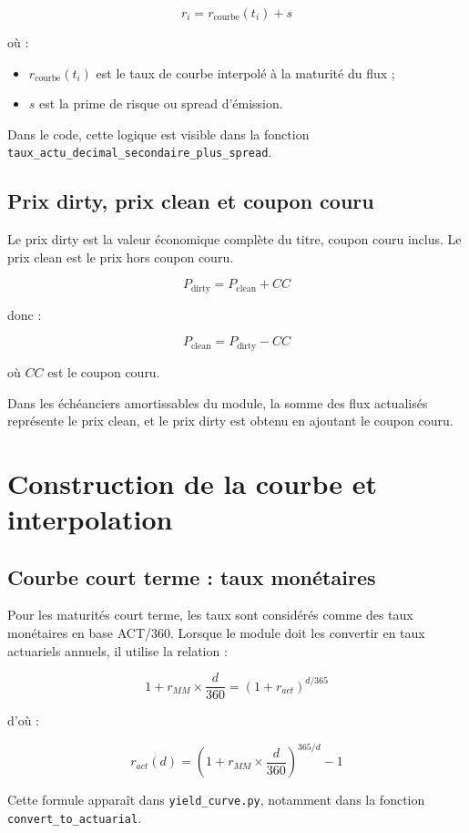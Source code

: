 \documentclass[12pt,a4paper]{article}
\begin{document}
\[
r_i = r_{\text{courbe}}(t_i) + s
\]

où :

\begin{itemize}
    \item $r_{\text{courbe}}(t_i)$ est le taux de courbe interpolé à la maturité du flux ;
    \item $s$ est la prime de risque ou spread d'émission.
\end{itemize}

Dans le code, cette logique est visible dans la fonction \texttt{taux\_actu\_decimal\_secondaire\_plus\_spread}.

\subsection{Prix dirty, prix clean et coupon couru}

Le prix dirty est la valeur économique complète du titre, coupon couru inclus. Le prix clean est le prix hors coupon couru.

\[
P_{\text{dirty}} = P_{\text{clean}} + CC
\]

donc :

\[
P_{\text{clean}} = P_{\text{dirty}} - CC
\]

où $CC$ est le coupon couru.

Dans les échéanciers amortissables du module, la somme des flux actualisés représente le prix clean, et le prix dirty est obtenu en ajoutant le coupon couru.

\section{Construction de la courbe et interpolation}

\subsection{Courbe court terme : taux monétaires}

Pour les maturités court terme, les taux sont considérés comme des taux monétaires en base ACT/360. Lorsque le module doit les convertir en taux actuariels annuels, il utilise la relation :

\[
1 + r_{MM} \times \frac{d}{360}
=
(1 + r_{act})^{d/365}
\]

d'où :

\[
r_{act}(d)
=
\left(1 + r_{MM} \times \frac{d}{360}\right)^{365/d} - 1
\]

Cette formule apparaît dans \texttt{yield\_curve.py}, notamment dans la fonction \texttt{convert\_to\_actuarial}.
\end{document}
